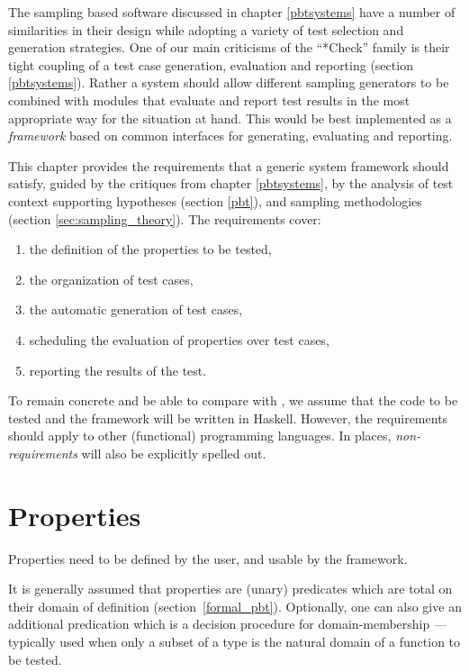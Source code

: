 The sampling based \pbt software discussed in chapter \ref{pbtsystems}
have a number of similarities in their design
while adopting a variety of test selection and generation strategies.
One of our main criticisms of the ``*Check'' family
is their tight coupling of a test case generation, evaluation and reporting
(section \ref{pbtsystems}).
Rather a system should allow different sampling generators to be combined with
modules that evaluate and report test results in the most appropriate way for
the situation at hand.
This would be best implemented as a \emph{framework} 
based on common interfaces for generating, evaluating and reporting.

This chapter provides the requirements that a generic \pbt system framework
should satisfy, guided by the critiques from chapter \ref{pbtsystems},
by the analysis of test context supporting hypotheses (section \ref{pbt}), and 
sampling methodologies (section \ref{sec:sampling_theory}).
The requirements cover:
\begin{enumerate}
\item the definition of the properties to be tested,
\item the organization of test cases,
\item the automatic generation of test cases,
\item scheduling the evaluation of properties over test cases,
\item reporting the results of the test.
\end{enumerate}
\noindent
To remain concrete and be able to compare with \GC, we assume that the code
to be tested and the framework will be written in Haskell.  However, the
requirements should apply to other (functional) programming languages.
In places, \emph{non-requirements} will also be explicitly spelled out.

\section {Properties} \label{reqprop}

Properties need to be defined by the user, and usable by the framework.

It is generally assumed that properties are (unary) predicates which
are total on their domain of definition (section~\ref{formal_pbt}).
Optionally, one can also give an additional predication which is a decision
procedure for domain-membership --- typically used when only a subset of
a type is the natural domain of a function to be tested.


